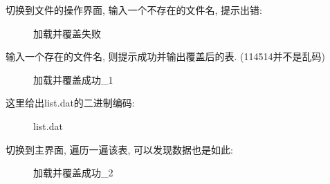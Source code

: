 \documentclass[supercite]{Experimental_Report}
\theoremstyle{definition}
\begin{document}
\clearpage
\noindent
切换到文件的操作界面, 输入一个不存在的文件名, 提示出错:
\begin{figure}[htbp]
	\centering
	\centering
	\caption{加载并覆盖失败}
	\label{fig3-10}
\end{figure}

\noindent
输入一个存在的文件名, 则提示成功并输出覆盖后的表. (114514并不是乱码)
\begin{figure}[htbp]
	\centering
	\centering
	\caption{加载并覆盖成功\_1}
	\label{fig3-11}
\end{figure}

\noindent
这里给出list.dat的二进制编码:
\begin{figure}[htbp]
	\centering
	\centering
	\caption{list.dat}
	\label{fig3-12}
\end{figure}

\noindent
切换到主界面, 遍历一遍该表, 可以发现数据也是如此:
\begin{figure}[H]
	\centering
	\centering
	\caption{加载并覆盖成功\_2}
	\label{fig3-13}
\end{figure}
\end{document}
